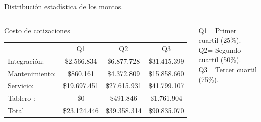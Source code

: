 \documentclass[aspectratio=169,xcolor=dvipsnames]{beamer}
\begin{document}

 \begin{frame}{Distribución estadística de los montos.}
 \begin{columns}[c]
\begin{block}{Costo de cotizaciones}
     \begin{tabular}{lccc}
                       & Q1 & Q2 & Q3\\ 
          Integración:&\$2.566.834 &\$6.877.728&\$31.415.399\\ 
          Mantenimiento:&\$860.161&\$4.372.809&\$15.858.660\\
          Servicio:&\$19.697.451&\$27.615.931&\$41.799.107\\ 
          Tablero :&\$0&\$491.846&\$1.761.904\\ \hline 
          Total&\$23.124.446&\$39.358.314 & \$90.835.070 \\
     \end{tabular}
\end{block}
 \begin{block}{}
    \scriptsize{Q1= Primer cuartil (25\%).\\
    Q2= Segundo cuartil (50\%).\\
    Q3= Tercer cuartil (75\%).}
\end{block}
 \end{columns}
\end{frame}

\end{document}
